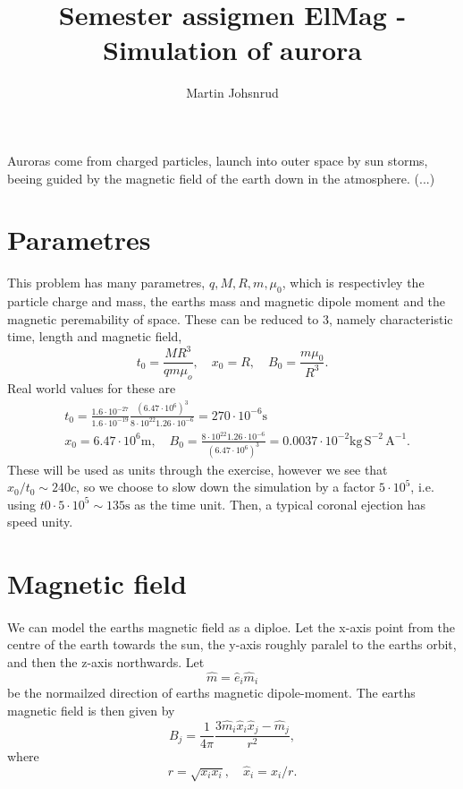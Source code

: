 \documentclass{article}
\title{Semester assigmen ElMag - Simulation of aurora}
\author{Martin Johsnrud}
\begin{document}
    \maketitle

    Auroras come from charged particles, launch into outer space by sun storms, beeing guided by the magnetic field of the earth down in the atmosphere. (...) 
    
    \section*{Parametres}
        This problem has many parametres, $q, M, R, m, \mu_0$, which is respectivley the particle charge and mass, the earths mass and magnetic dipole moment and the magnetic peremability of space. These can be reduced to 3, namely characteristic time, length and magnetic field,
        \begin{equation*}
            t_0 = \frac{M R^3}{q m \mu_o}, \quad x_0 = R, \quad B_0 = \frac{m \mu_0}{R^3}.
        \end{equation*}
        Real world values for these are  
        \begin{align*}
            & t_0 = \frac{1.6 \cdot 10^{-27}}{1.6\cdot10^{-19}}\frac{(6.47 \cdot 10^6)^3 }{8 \cdot 10^{22} 1.26 \cdot 10^{-6} } = 270 \cdot 10^{-6} \textrm{s}\\
            & x_0 = 6.47 \cdot 10^6 \textrm{m}, \quad
            B_0 = \frac{8 \cdot 10^{22} 1.26 \cdot 10^{-6}}{(6.47 \cdot 10^6)^3} = 0.0037 \cdot 10^{-2} \textrm{kg} \, \textrm{S}^{-2} \, \textrm{A}^{-1}.
        \end{align*}
        These will be used as units through the exercise, however we see that $x_0 / t_0 \sim 240 c$, so we choose to slow down the simulation by a factor $ 5\cdot 10^5$, i.e. using $t0 \cdot 5\cdot 10^5 \sim 135 \textrm{s}$ as the time unit. Then, a typical coronal ejection has speed unity.

    \section*{Magnetic field}
    \paragraph{}
    We can model the earths magnetic field as a diploe. Let the x-axis point from the centre of the earth towards the sun, the y-axis roughly paralel to the earths orbit, and then the z-axis northwards. Let
        \begin{equation*}
            \hat m = \hat e_i \hat m_i
        \end{equation*}
        be the normailzed direction of earths magnetic dipole-moment. The earths magnetic field is then given by
        \begin{equation}
            B_j = \frac{1}{4\pi} \frac{3\hat m_i \hat x_i \hat x_j - \hat m_j}{r^2},
        \end{equation}
        where
        \begin{equation*}
            r = \sqrt{x_ix_i}, \quad \hat x_i = x_i / r.
        \end{equation*}
\end{document}
